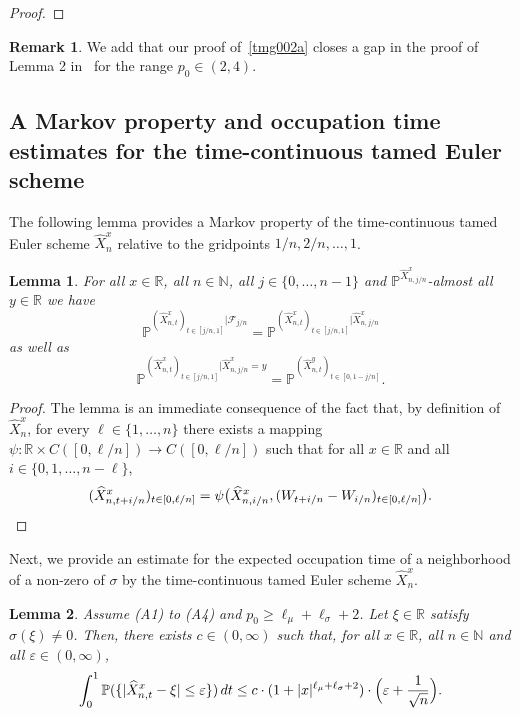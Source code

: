 \documentclass[11pt]{amsart}
\newcommand{\R}{{\mathbb R}}
\newcommand{\N}{{\mathbb N}}
\newcommand{\PP}{{\mathbb P}}
\newcommand{\eul}{{\widehat X}}
\newcommand{\eps}{\varepsilon}
\theoremstyle{plain}
\newtheorem{lemma}{Lemma}
\theoremstyle{definition}
\newtheorem{rem}{Remark}
\begin{document}
\begin{proof}
\end{proof}

\begin{rem}\label{gap}
	We add that our proof of~\eqref{tmg002a} closes a gap in the proof of Lemma 2 in~\cite{Sabanis2016} for the range $p_0\in(2,4)$.
\end{rem}

\subsection{A Markov property and occupation time estimates for the time-continuous tamed Euler scheme}\label{4.2}

The following lemma provides a Markov property of the time-continuous tamed Euler
scheme  $\eul^x_n$ relative to the gridpoints $1/n,2/n,\ldots,1$.

\begin{lemma}\label{markov}
For all $x\in\R$, all $n\in\N$, all $j\in\{0, \ldots, n-1\}$ and $\PP ^{\eul_{n,j/n}^x} $-almost all $y\in\R$ we have
\[
\PP ^{(\eul_{n,t}^x)_{t\in [j/n, 1]}|\mathcal F_{j/n}}=\PP ^{(\eul_{n,t}^x)_{t\in [j/n, 1]}|\eul_{n,j/n}^x}
\]
as well as
\[
\PP ^{(\eul_{n,t}^x)_{t\in [j/n, 1]}|\eul_{n,j/n}^x=y}=\PP ^{(\eul^y_{n,t})_{t\in [0,1-j/n]}}.
\]
\end{lemma}
\begin{proof}
The lemma is an immediate consequence of the fact that, by definition of $\eul_n^x$, for every $\ell\in \{1,\ldots,n\}$  there exists a mapping $\psi\colon \R\times C([0,\ell/n]) \to C([0,\ell/n]) $ such that for all $x\in\R$ and all $i\in\{0,1,\ldots,n-\ell\}$,
\[
(\eul^x_{n,t+i/n})_{t\in[0, \ell/n]} = \psi\bigl(\eul^x_{n, i/n},(W_{t+i/n}-W_{i/n})_{t\in[0, \ell/n]}\bigr).\qedhere
\]
\end{proof}



Next, we provide an estimate for the expected occupation time  of a neighborhood of   a non-zero of $\sigma$ by the time-continuous tamed Euler scheme $\eul_{n}^x$.



\begin{lemma}\label{occup} Assume (A1) to (A4) and $p_0\ge \ell_\mu+\ell_\sigma+2$.
Let $\xi\in\R$ satisfy $\sigma(\xi)\not=0$. Then, there exists $ c\in (0, \infty)$ such that, for   all $x\in\R$, all $n\in\N$ and all $\eps\in (0,\infty)$,
\begin{equation}
\int_0^1  \PP(\{|\eul_{n,t}^x-\xi|\leq \varepsilon\})\,dt\leq c\cdot
(1+|x|^{\ell_\mu +\ell_\sigma +2})\cdot\Bigl(\varepsilon+\frac{1}{\sqrt n}\Bigr).
\end{equation}
\end{lemma}
\end{document}
